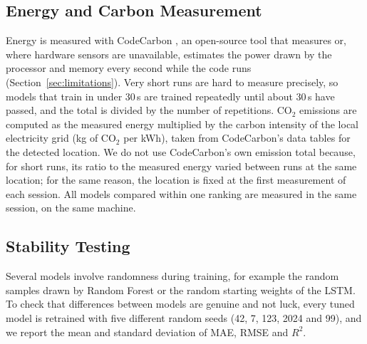 \documentclass[conference,letterpaper,10pt]{IEEEtran}
\begin{document}
\subsection{Energy and Carbon Measurement}
Energy is measured with CodeCarbon \cite{courty2024codecarbon}, an open-source tool that measures or, where hardware sensors are unavailable, estimates the power drawn by the processor and memory every second while the code runs (Section~\ref{sec:limitations}). Very short runs are hard to measure precisely, so models that train in under 30\,s are trained repeatedly until about 30\,s have passed, and the total is divided by the number of repetitions. CO$_2$ emissions are computed as the measured energy multiplied by the carbon intensity of the local electricity grid (kg of CO$_2$ per kWh), taken from CodeCarbon's data tables for the detected location. We do not use CodeCarbon's own emission total because, for short runs, its ratio to the measured energy varied between runs at the same location; for the same reason, the location is fixed at the first measurement of each session. All models compared within one ranking are measured in the same session, on the same machine.

\subsection{Stability Testing}
Several models involve randomness during training, for example the random samples drawn by Random Forest or the random starting weights of the LSTM. To check that differences between models are genuine and not luck, every tuned model is retrained with five different random seeds (42, 7, 123, 2024 and 99), and we report the mean and standard deviation of MAE, RMSE and $R^2$.
\end{document}

